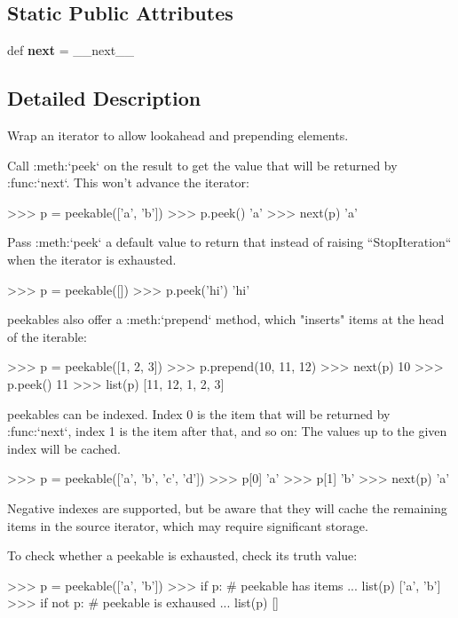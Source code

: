\subsection*{Static Public Attributes}
\begin{DoxyCompactItemize}
\item 
\mbox{\label{classmore__itertools_1_1more_1_1peekable_ab96955452c0413b2b8d36d82bb0b08ac}} 
def {\bfseries next} = \+\_\+\+\_\+next\+\_\+\+\_\+
\end{DoxyCompactItemize}


\subsection{Detailed Description}
\begin{DoxyVerb}Wrap an iterator to allow lookahead and prepending elements.

Call :meth:`peek` on the result to get the value that will be returned
by :func:`next`. This won't advance the iterator:

    >>> p = peekable(['a', 'b'])
    >>> p.peek()
    'a'
    >>> next(p)
    'a'

Pass :meth:`peek` a default value to return that instead of raising
``StopIteration`` when the iterator is exhausted.

    >>> p = peekable([])
    >>> p.peek('hi')
    'hi'

peekables also offer a :meth:`prepend` method, which "inserts" items
at the head of the iterable:

    >>> p = peekable([1, 2, 3])
    >>> p.prepend(10, 11, 12)
    >>> next(p)
    10
    >>> p.peek()
    11
    >>> list(p)
    [11, 12, 1, 2, 3]

peekables can be indexed. Index 0 is the item that will be returned by
:func:`next`, index 1 is the item after that, and so on:
The values up to the given index will be cached.

    >>> p = peekable(['a', 'b', 'c', 'd'])
    >>> p[0]
    'a'
    >>> p[1]
    'b'
    >>> next(p)
    'a'

Negative indexes are supported, but be aware that they will cache the
remaining items in the source iterator, which may require significant
storage.

To check whether a peekable is exhausted, check its truth value:

    >>> p = peekable(['a', 'b'])
    >>> if p:  # peekable has items
    ...     list(p)
    ['a', 'b']
    >>> if not p:  # peekable is exhaused
    ...     list(p)
    []\end{DoxyVerb}
 

